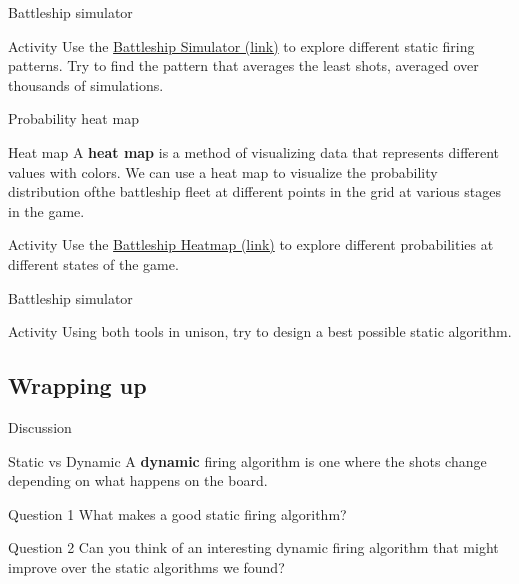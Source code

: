 \documentclass{beamer}
\begin{document}
\begin{frame}{Battleship simulator}
  \begin{block}{Activity}
    Use the {\color{blue}\href{https://wcasper.github.io/math180fall2026/code/battleship/battleship-simulator}{Battleship Simulator (link)}} to explore different static firing patterns.
    Try to find the pattern that averages the least shots, averaged over thousands of simulations.
  \end{block}
\end{frame}

\begin{frame}{Probability heat map}
  \begin{block}{Heat map}
    A \textbf{heat map} is a method of visualizing data that represents different values with colors.  We can use a heat map to visualize the probability distribution ofthe battleship fleet at different points in the grid at various stages in the game.
  \end{block}
  \begin{block}{Activity}
    Use the {\color{blue}\href{https://wcasper.github.io/math180fall2026/code/heatmap/battleship-heatmap}{Battleship Heatmap (link)}} to explore different probabilities at different states of the game.
  \end{block}
\end{frame}

\begin{frame}{Battleship simulator}
  \begin{block}{Activity}
    Using both tools in unison, try to design a best possible static algorithm.
  \end{block}
\end{frame}

\subsection{Wrapping up}

\begin{frame}{Discussion}
\pause
  \begin{block}{Static vs Dynamic}
	A \textbf{dynamic} firing algorithm is one where the shots change depending
    on what happens on the board.
  \end{block}
\pause
  \begin{block}{Question 1}
    What makes a good static firing algorithm?
  \end{block}
\pause
  \begin{block}{Question 2}
    Can you think of an interesting dynamic firing algorithm that might improve over  the static algorithms we found?
  \end{block}
\end{frame}
\end{document}
